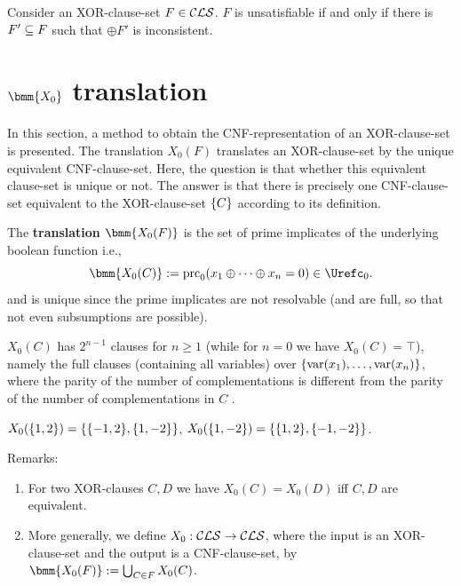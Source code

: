 \documentclass[12pt]{book}
\begin{document}
\begin{lem}\label{lem:characimplxor}
  \cite{h8} Consider an XOR-clause-set $F \in \mathcal{CLS}$. $F$ is unsatisfiable if and only if there is $F' \subseteq F$ such that $\oplus F'$ is inconsistent.

\end{lem}
\section{$\bmm{X_0}$ translation}
\label{sec:x0}

In this section, a method to obtain the CNF-representation of an XOR-clause-set is presented. The translation $X_0(F)$ 
translates an XOR-clause-set by the unique equivalent CNF-clause-set. Here, the question is that whether this equivalent clause-set 
is unique or not. The answer is that there is precisely one CNF-clause-set equivalent to the XOR-clause-set $\{ C \}$ according 
to its definition.

\begin{defi}\label{def:x0def} 
The \textbf{translation} $\bmm{X_0(F)}$ is the set of prime implicates of the underlying boolean function i.e., 
\begin{displaymath}
  \bmm{X_0(C)} := \primec_0(x_1 \oplus \dots \oplus x_n = 0) \in \Urefc_0.
\end{displaymath}
and is unique since the prime implicates are not resolvable (and are full, 
so that not even subsumptions are possible).

$X_0(C)$ has $2^{n-1}$ clauses for $n \ge 1$ (while for $n=0$ we have $X_0(C) = \top$), namely the full clauses (containing all variables) 
over $\{ \operatorname{var}(x_1),\dots,\operatorname{var}(x_n) \}$, where the parity of the number of complementations is different from the parity of the number of 
complementations in $C$ \cite{h8}.
\end{defi}

\begin{examp}\label{exp:X0}
  \cite{h8} $X_0(\{ 1,2 \}) = \{ \{ -1,2 \},\{ 1,-2 \} \}$, $X_0(\{ 1,-2 \}) = \{ \{ 1,2 \},\{ -1,-2 \} \}$.
\end{examp}

Remarks:
\begin{enumerate}
  \item For two XOR-clauses $C, D$ we have $X_0(C) = X_0(D)$ iff $C, D$ are equivalent.
  \item More generally, we define $X_0: \mathcal{CLS} \rightarrow \mathcal{CLS}$, where the input is an XOR-clause-set and the output is a CNF-clause-set, 
  by $\bmm{X_0(F)} := \bc_{C \in F} X_0(C)$.
  
\end{enumerate}  
\end{document}
